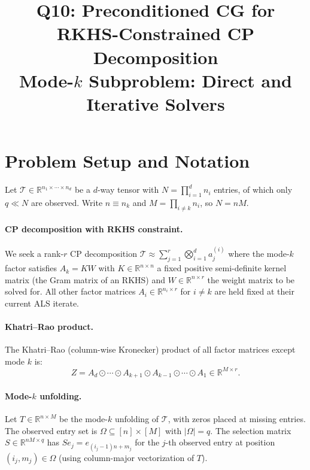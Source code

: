 \documentclass[12pt]{article}
\title{Q10: Preconditioned CG for RKHS-Constrained CP Decomposition\\
\large Mode-$k$ Subproblem: Direct and Iterative Solvers}
\author{}
\date{}
\theoremstyle{definition}
\begin{document}
\maketitle

\section{Problem Setup and Notation}

Let $\mathcal{T} \in \mathbb{R}^{n_1 \times \cdots \times n_d}$ be a $d$-way tensor with $N = \prod_{i=1}^d n_i$ entries, of which only $q \ll N$ are observed. Write $n \equiv n_k$ and $M = \prod_{i \neq k} n_i$, so $N = nM$.

\paragraph{CP decomposition with RKHS constraint.}
We seek a rank-$r$ CP decomposition $\mathcal{T} \approx \sum_{j=1}^r \bigotimes_{i=1}^d a_j^{(i)}$ where the mode-$k$ factor satisfies $A_k = KW$ with $K \in \mathbb{R}^{n \times n}$ a fixed positive semi-definite kernel matrix (the Gram matrix of an RKHS) and $W \in \mathbb{R}^{n \times r}$ the weight matrix to be solved for. All other factor matrices $A_i \in \mathbb{R}^{n_i \times r}$ for $i \neq k$ are held fixed at their current ALS iterate.

\paragraph{Khatri--Rao product.}
The Khatri--Rao (column-wise Kronecker) product of all factor matrices except mode $k$ is:
\[
Z = A_d \odot \cdots \odot A_{k+1} \odot A_{k-1} \odot \cdots \odot A_1 \in \mathbb{R}^{M \times r}.
\]

\paragraph{Mode-$k$ unfolding.}
Let $T \in \mathbb{R}^{n \times M}$ be the mode-$k$ unfolding of $\mathcal{T}$, with zeros placed at missing entries. The observed entry set is $\Omega \subseteq [n] \times [M]$ with $|\Omega| = q$. The selection matrix $S \in \mathbb{R}^{nM \times q}$ has $S e_j = e_{(i_j - 1)n + m_j}$ for the $j$-th observed entry at position $(i_j, m_j) \in \Omega$ (using column-major vectorization of $T$).
\end{document}
